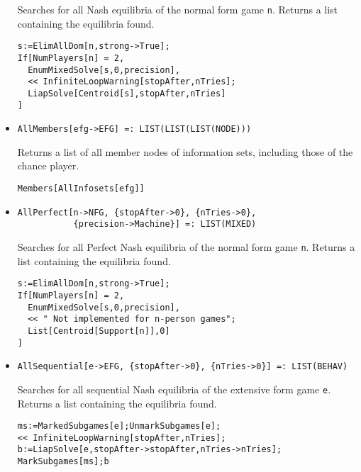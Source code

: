 \begin{itemize}
\bd 
Searches for all Nash equilibria of the normal form game
\verb+n+.  Returns a list containing the equilibria found.

\begin{verbatim}
s:=ElimAllDom[n,strong->True];
If[NumPlayers[n] = 2, 
  EnumMixedSolve[s,0,precision],
  << InfiniteLoopWarning[stopAfter,nTries];
  LiapSolve[Centroid[s],stopAfter,nTries]
]
\end{verbatim} 
\ed

\item{}
\protect \large \begin{verbatim}
AllMembers[efg->EFG] =: LIST(LIST(LIST(NODE))) 
\end{verbatim}\normalsize

\bd 
Returns a list of all member nodes of information sets, including
those of the chance player.
\begin{verbatim}
Members[AllInfosets[efg]]
\end{verbatim} 
\ed

\item{}
\protect \large \begin{verbatim}
AllPerfect[n->NFG, {stopAfter->0}, {nTries->0}, 
           {precision->Machine}] =: LIST(MIXED) 
\end{verbatim}\normalsize

\bd 
Searches for all Perfect Nash equilibria of the normal form game
\verb+n+.  Returns a list containing the equilibria found.

\begin{verbatim}
s:=ElimAllDom[n,strong->True];
If[NumPlayers[n] = 2, 
  EnumMixedSolve[s,0,precision],
  << " Not implemented for n-person games";
  List[Centroid[Support[n]],0]
]
\end{verbatim} 
\ed

\item{}
\protect \large \begin{verbatim}
AllSequential[e->EFG, {stopAfter->0}, {nTries->0}] =: LIST(BEHAV) 
\end{verbatim}\normalsize

\bd 
Searches for all sequential Nash equilibria of the extensive form
game \verb+e+.  Returns a list containing the equilibria found.

\begin{verbatim}
ms:=MarkedSubgames[e];UnmarkSubgames[e];
<< InfiniteLoopWarning[stopAfter,nTries];
b:=LiapSolve[e,stopAfter->stopAfter,nTries->nTries];
MarkSubgames[ms];b
\end{verbatim} 
\ed


\end{itemize}
